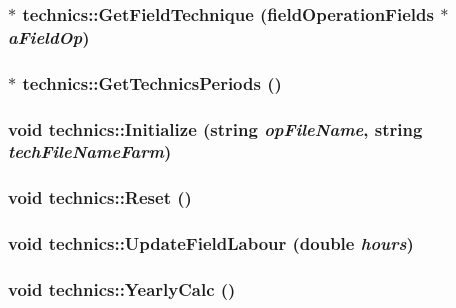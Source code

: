 \label{classtechnics_ad2b4807ba763ac388ab4d6c234924824}
\hypertarget{classtechnics_a5d57f2ddaeab8b58d29541bf99918434}{
\subsubsection[{GetFieldTechnique}]{ $\ast$ technics::GetFieldTechnique ({\bf fieldOperationFields} $\ast$ {\em aFieldOp})}}
\label{classtechnics_a5d57f2ddaeab8b58d29541bf99918434}
\hypertarget{classtechnics_a9c1e0dbe77fc4d0b0e5574a3a4bcc036}{
\subsubsection[{GetTechnicsPeriods}]{$\ast$ technics::GetTechnicsPeriods ()}}
\label{classtechnics_a9c1e0dbe77fc4d0b0e5574a3a4bcc036}
\hypertarget{classtechnics_ac3119cfc01ae6232db8bbd5b0d0b3167}{
\subsubsection[{Initialize}]{\setlength{\rightskip}{0pt plus 5cm}void technics::Initialize (string {\em opFileName}, \/  string {\em techFileNameFarm})}}
\label{classtechnics_ac3119cfc01ae6232db8bbd5b0d0b3167}
\hypertarget{classtechnics_a14c35cb20c7f722efbc95b314f63ad19}{
\subsubsection[{Reset}]{\setlength{\rightskip}{0pt plus 5cm}void technics::Reset ()}}
\label{classtechnics_a14c35cb20c7f722efbc95b314f63ad19}
\hypertarget{classtechnics_a6ea8c7844295bb257bfefdea2d9987de}{
\subsubsection[{UpdateFieldLabour}]{\setlength{\rightskip}{0pt plus 5cm}void technics::UpdateFieldLabour (double {\em hours})}}
\label{classtechnics_a6ea8c7844295bb257bfefdea2d9987de}
\hypertarget{classtechnics_ab3e5249c76b64203b756a9f561a9d4e4}{
\subsubsection[{YearlyCalc}]{\setlength{\rightskip}{0pt plus 5cm}void technics::YearlyCalc ()}}
\label{classtechnics_ab3e5249c76b64203b756a9f561a9d4e4}


